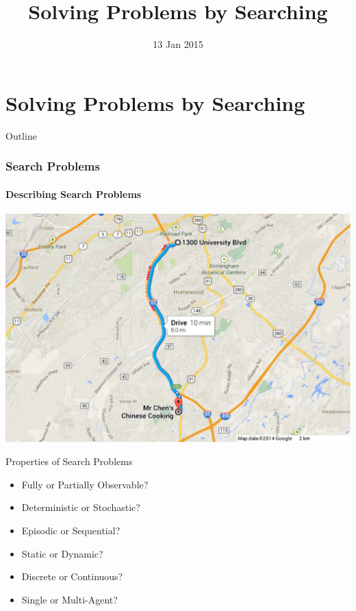 \documentclass[14pt]{beamer}
\title{Solving Problems by Searching}
\date[]{13 Jan 2015}
\begin{document}
\begin{frame}
  \titlepage
\end{frame}

\part{Solving Problems by Searching}

\begin{frame}{Outline}
\tableofcontents
\end{frame}

\section{Search Problems}

\subsection{Describing Search Problems}
\begin{frame}[plain]
	\begin{center}
		\includegraphics[width=\textwidth]{uab-to-mr-chens.pdf}
	\end{center}
\end{frame}

\begin{frame}{Properties of Search Problems}
	\begin{itemize}
		\item \alert<2->{Fully} or Partially Observable?
		\item \alert<3->{Deterministic} or Stochastic?
		\item Episodic or \alert<4->{Sequential}?
		\item \alert<5->{Static} or Dynamic?
		\item \alert<6->{Discrete} or Continuous?
		\item \alert<7->{Single} or Multi-Agent?
	\end{itemize}
\end{frame}
\end{document}
